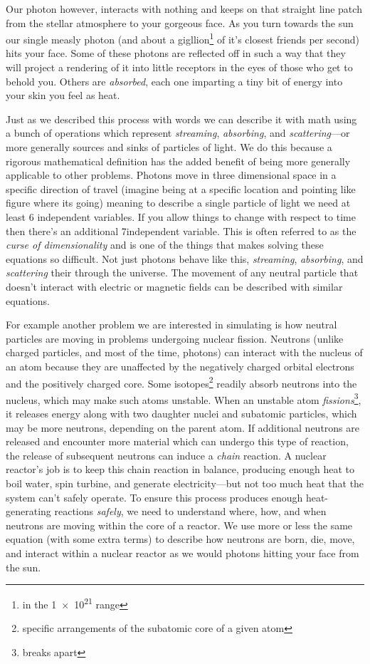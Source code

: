 Our photon however, interacts with nothing and keeps on that straight line patch from the stellar atmosphere to your gorgeous face.
As you turn towards the sun our single measly photon (and about a gigllion\footnote{in the \num{1e21} range} of it's closest friends per second) hits your face.
Some of these photons are reflected off in such a way that they will project a rendering of it into little receptors in the eyes of those who get to behold you.
Others are \textit{absorbed}, each one imparting a tiny bit of energy into your skin you feel as heat.

Just as we described this process with words we can describe it with math using a bunch of operations which represent \textit{streaming}, \textit{absorbing}, and \textit{scattering}---or more generally sources and sinks of particles of light.
We do this because a rigorous mathematical definition has the added benefit of being more generally applicable to other problems.
Photons move in three dimensional space in a specific direction of travel (imagine being at a specific location and pointing like figure where its going) meaning to describe a single particle of light we need at least 6 independent variables.
If you allow things to change with respect to time then there's an additional 7\ths independent variable.
This is often referred to as the \textit{curse of dimensionality} and is one of the things that makes solving these equations so difficult.
Not just photons behave like this, \textit{streaming}, \textit{absorbing}, and \textit{scattering} their through the universe.
The movement of any neutral particle that doesn't interact with electric or magnetic fields can be described with similar equations.

For example another problem we are interested in simulating is how neutral particles are moving in problems undergoing nuclear fission.
Neutrons (unlike charged particles, and most of the time, photons) can interact with the nucleus of an atom because they are unaffected by the negatively charged orbital electrons and the positively charged core.
Some isotopes\footnote{specific arrangements of the subatomic core of a given atom} readily absorb neutrons into the nucleus, which may make such atoms unstable.
When an unstable atom \textit{fissions}\footnote{breaks apart}, it releases energy along with two daughter nuclei and subatomic particles, which may be more neutrons, depending on the parent atom.
If additional neutrons are released and encounter more material which can undergo this type of reaction, the release of subsequent neutrons can induce a \textit{chain} reaction.
A nuclear reactor's job is to keep this chain reaction in balance, producing enough heat to boil water, spin turbine, and generate electricity---but not too much heat that the system can't safely operate.
To ensure this process produces enough heat-generating reactions \textit{safely}, we need to understand where, how, and when neutrons are moving within the core of a reactor.
We use more or less the same equation (with some extra terms) to describe how neutrons are born, die, move, and interact within a nuclear reactor as we would photons hitting your face from the sun.

